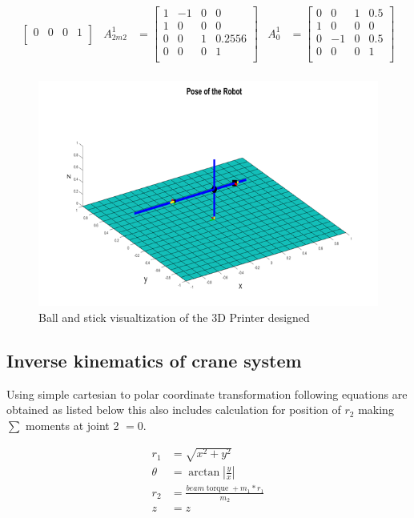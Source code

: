 \documentclass{UoNMCHA}
\numberwithin{equation}{section}
\begin{document}
\begin{align*}
\begin{bmatrix}
	0 & 0 & 0 & 1\\
	\end{bmatrix} & 		
	A_{2m2}^1 &= 
	\begin{bmatrix}
	1 & -1 & 0 & 0 \\
	1 & 0 & 0 & 0\\
	0 & 0 & 1 & 0.2556\\
	0 & 0 & 0 & 1\\
	\end{bmatrix} &	
	A_0^1 &= 
	\begin{bmatrix}
	0 & 0 & 1 & 0.5 \\
	1 & 0 & 0 & 0\\
	0 & -1 & 0 & 0.5\\
	0 & 0 & 0 & 1\\
	\end{bmatrix} \\
	\end{align*}
	
	\begin{figure}[H]
		\begin{center}
			\includegraphics[width=.8\linewidth]{figs/Picture8}
			\caption{Ball and stick visualtization of the 3D Printer designed}
			\label{figs/Picture8}
		\end{center}
	\end{figure}
	
	\newpage
	\subsection{Inverse kinematics of crane system}
	
	Using simple cartesian to polar coordinate transformation following equations are obtained as listed
	below this also includes calculation for position of $r_{2}$ making $\sum$ moments at joint 2 $=0$.
	
	\begin{align}
	r_{1} & =\sqrt{x^{2}+y^{2}} \\ 
	\theta & =\arctan \left|\frac{y}{x}\right| \\
	r_{2} &=\frac{b e a m \operatorname{torque}+m_{1} * r_{1}}{m_{2}} \\ 
	z & =z 
	\end{align}
	
\end{document}

